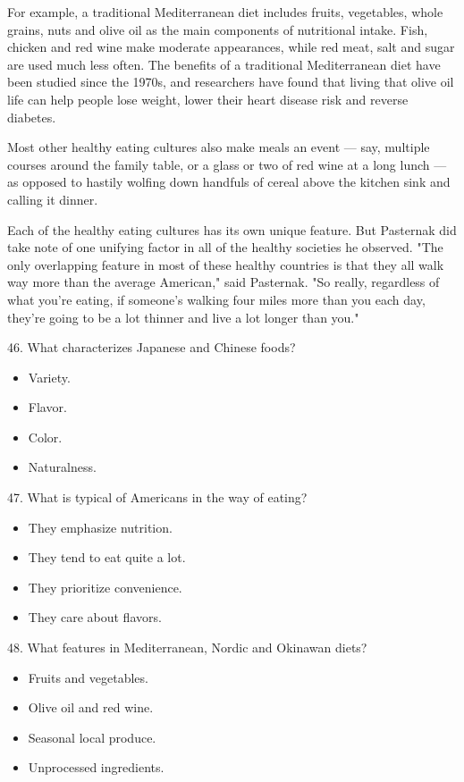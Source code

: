 \documentclass[UTF8,11pt]{ctexart}
\begin{document}
For example, a traditional Mediterranean diet includes fruits, vegetables, whole grains, nuts and olive oil as the main components of nutritional intake. Fish, chicken and red wine make moderate appearances, while red meat, salt and sugar are used much less often. The benefits of a traditional Mediterranean diet have been studied since the 1970s, and researchers have found that living that olive oil life can help people lose weight, lower their heart disease risk and reverse diabetes.


Most other healthy eating cultures also make meals an event — say, multiple courses around the family table, or a glass or two of red wine at a long lunch — as opposed to hastily wolfing down handfuls of cereal above the kitchen sink and calling it dinner.


Each of the healthy eating cultures has its own unique feature. But Pasternak did take note of one unifying factor in all of the healthy societies he observed. "The only overlapping feature in most of these healthy countries is that they all walk way more than the average American," said Pasternak. "So really, regardless of what you're eating, if someone's walking four miles more than you each day, they're going to be a lot thinner and live a lot longer than you."


46. What characterizes Japanese and Chinese foods?


\begin{itemize}[leftmargin=2em,itemsep=.2em,topsep=.4em]\item[A.] Variety.
\item[B.] Flavor.
\item[C.] Color.
\item[D.] Naturalness.
\end{itemize}

47. What is typical of Americans in the way of eating?


\begin{itemize}[leftmargin=2em,itemsep=.2em,topsep=.4em]\item[A.] They emphasize nutrition.
\item[B.] They tend to eat quite a lot.
\item[C.] They prioritize convenience.
\item[D.] They care about flavors.
\end{itemize}

48. What features in Mediterranean, Nordic and Okinawan diets?


\begin{itemize}[leftmargin=2em,itemsep=.2em,topsep=.4em]\item[A.] Fruits and vegetables.
\item[B.] Olive oil and red wine.
\item[C.] Seasonal local produce.
\item[D.] Unprocessed ingredients.
\end{itemize}
\end{document}
